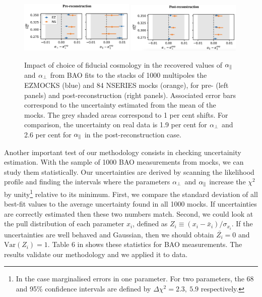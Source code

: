\begin{figure}
    \centering 
    \includegraphics[width=0.49\textwidth]{fig/galaxies/bao_bias_prerecon.png}
    \includegraphics[width=0.49\textwidth]{fig/galaxies/bao_bias_postrecon.png}
    \caption{Impact of choice of fiducial cosmology in the recovered values
    of ${\alpha_\parallel}$ and ${\alpha_\perp}$ from BAO fits to the stacks of 1000 multipoles the \textsc{EZMOCKS} 
    (blue) and 84 \textsc{NSERIES} mocks (orange), for pre- (left panels) and post-reconstruction
    (right panels). Associated error bars correspond to the uncertainty estimated from 
    the mean of the mocks. The grey shaded areas correspond to 1 per cent shifts. 
    For comparison, the uncertainty on real data is 1.9 per cent for ${\alpha_\perp}$ 
    and 2.6 per cent for ${\alpha_\parallel}$ in the post-reconstruction case.
    }
    \label{fig:bao_bias_mocks}
\end{figure}

Another important test of our methodology consists in checking uncertainity estimation. 
With the sample of 1000 BAO measurements from mocks, we can study them statistically. 
Our uncertainties are derived by scanning the likelihood profile and finding the intervals
where the parameters ${\alpha_\perp}$ and ${\alpha_\parallel}$ increase the $\chi^2$ by 
unity\footnote{In the case marginalised errors in one parameter. For two parameters, 
the 68 and 95\% confidence intervals are defined by $\Delta \chi^2 = 2.3, \ 5.9$ respectively.} 
relative to its minimum. 
First, we compare the standard deviation of all best-fit values to the average uncertainty
found in all 1000 mocks. If uncertainties are correctly estimated then these two numbers 
match. Second, we could look at the pull distribution of each parameter $x_i$, defined as 
$Z_i \equiv (x_i - \bar{x}_i)/\sigma_{x_i}$. If the uncertainties are well behaved and Gaussian, 
then we should obtain $\bar{Z_i}=0$ and $\text{Var}(Z_i) = 1$. 
Table 6 in \cite{bautistaCompletedSDSSIVExtended2021} shows these statistics for BAO measurements. 
The results validate our methodology and we applied it to data.  

